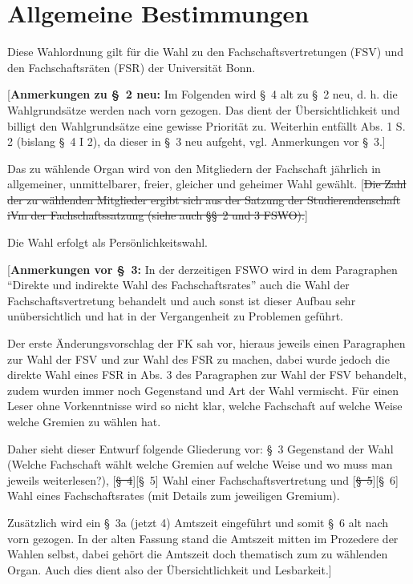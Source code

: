 \documentclass[%
draft,%
multilinesections%
]{fswo}
\newcommand\oldT[1]  {{\color{Gray}[\st{#1}]}}
\newcommand\newT[1]  {{\color{Green}[#1]}}
\newcommand\bemFr[1] {{\color{Red}[#1]}}
\newcommand\oldT[1]{}%
\newcommand\newT[1]{#1}
\newcommand\bemFr[1]{}%
\newcommand\change[2]{\oldT{#1}\newT{#2}}
\begin{document}
\section{Allgemeine Bestimmungen}

\begin{contract}
Diese Wahlordnung gilt für die Wahl zu den Fachschaftsvertretungen (FSV) und den Fachschaftsräten (FSR) der Universität Bonn.
\end{contract}

\bemFr{\textbf{Anmerkungen zu \S~2 neu:}
Im Folgenden wird \S~4 alt zu \S~2 neu, d. h. die Wahlgrundsätze werden nach vorn gezogen.
Das dient der Übersichtlichkeit und billigt den Wahlgrundsätze eine gewisse Priorität zu.
Weiterhin entfällt Abs. 1 S. 2 (bislang \S~4 I 2), da dieser in \S~3 neu aufgeht, vgl. Anmerkungen vor \S~3.}

\begin{contract}
Das zu wählende Organ wird von den Mitgliedern der Fachschaft jährlich in allgemeiner, unmittelbarer, freier, gleicher und geheimer Wahl gewählt. \oldT{Die Zahl der zu wählenden Mitglieder ergibt sich aus der Satzung der Studierendenschaft iVm der Fachschaftssatzung (siehe auch \S\S~2 und 3 FSWO).}

Die Wahl erfolgt als Persönlichkeitswahl. \label{cls-wahlgrundsaetze:abs-persoenlichkeitswahl}
\end{contract}

\bemFr{\textbf{Anmerkungen vor \S~3:} In der derzeitigen FSWO wird in dem Paragraphen \enquote{Direkte und indirekte Wahl des Fachschaftsrates} auch die Wahl der Fachschaftsvertretung behandelt und auch sonst ist dieser Aufbau sehr unübersichtlich und hat in der Vergangenheit zu Problemen geführt.

Der erste Änderungsvorschlag der FK sah vor, hieraus jeweils einen Paragraphen zur Wahl der FSV und zur Wahl des FSR zu machen, dabei wurde jedoch die direkte Wahl eines FSR in Abs. 3 des Paragraphen zur Wahl der FSV behandelt, zudem wurden immer noch Gegenstand und Art der Wahl vermischt.
Für einen Leser ohne Vorkenntnisse wird so nicht klar, welche Fachschaft auf welche Weise welche Gremien zu wählen hat.

Daher sieht dieser Entwurf folgende Gliederung vor:
\S~3 Gegenstand der Wahl (Welche Fachschaft wählt welche Gremien auf welche Weise und wo muss man jeweils weiterlesen?), \change{\S~4}{\S~5} Wahl einer Fachschaftsvertretung und \change{\S~5}{\S~6} Wahl eines Fachschaftsrates (mit Details zum jeweiligen Gremium).

Zusätzlich wird ein \S~3a (jetzt 4) Amtszeit eingeführt und somit \S~6 alt nach vorn gezogen. In der alten Fassung stand die Amtszeit mitten im Prozedere der Wahlen selbst, dabei gehört die Amtszeit doch thematisch zum zu wählenden Organ. Auch dies dient also der Übersichtlichkeit und Lesbarkeit.}
\end{document}

